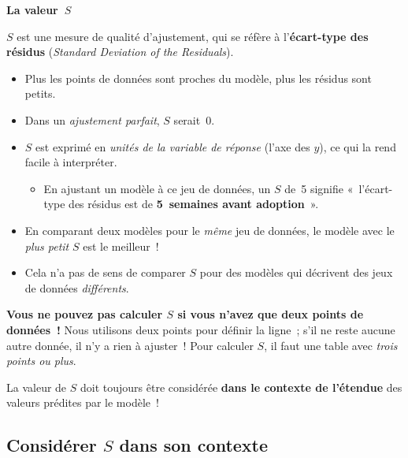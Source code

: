 \documentclass[12pt,a4paper]{article}
\begin{document}
\begin{keypointbox}
  \textbf{La valeur~$S$}

  $S$ est une mesure de qualité d'ajustement, qui se réfère à l'\textbf{écart-type des résidus} (\emph{Standard Deviation of the Residuals}).

  \begin{itemize}
    \item Plus les points de données sont proches du modèle, plus les résidus sont petits.
    \item Dans un \emph{ajustement parfait}, $S$ serait~$0$.
    \item $S$ est exprimé en \emph{unités de la variable de réponse} (l'axe des $y$), ce qui la rend facile à interpréter.
    \begin{itemize}
      \item En ajustant un modèle à ce jeu de données, un $S$ de~5 signifie «~l'écart-type des résidus est de \textbf{5~semaines avant adoption}~».
    \end{itemize}
    \item En comparant deux modèles pour le \emph{même} jeu de données, le modèle avec le \emph{plus petit} $S$ est le meilleur~!
    \item Cela n'a pas de sens de comparer $S$ pour des modèles qui décrivent des jeux de données \emph{différents}.
  \end{itemize}

  \vspace{0.4em}
  \textbf{Vous ne pouvez pas calculer $S$ si vous n'avez que deux points de données~!} Nous utilisons deux points pour définir la ligne~; s'il ne reste aucune autre donnée, il n'y a rien à ajuster~! Pour calculer $S$, il faut une table avec \emph{trois points ou plus}.

  \vspace{0.4em}
  La valeur de $S$ doit toujours être considérée \textbf{dans le contexte de l'étendue} des valeurs prédites par le modèle~!
\end{keypointbox}

\subsection{Considérer \texorpdfstring{$S$}{S} dans son contexte}
\end{document}
